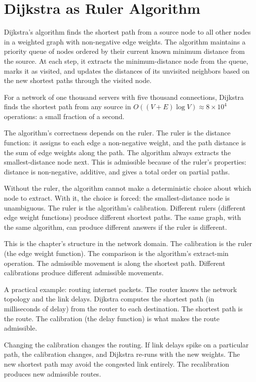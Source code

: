 \section{Dijkstra as Ruler Algorithm}
\label{se:dijkstra-as-ruler-algorithm}

Dijkstra's algorithm finds the shortest path from a source node to all
other nodes in a weighted graph with non-negative edge weights. The
algorithm maintains a priority queue of nodes ordered by their current
known minimum distance from the source. At each step, it extracts the
minimum-distance node from the queue, marks it as visited, and updates
the distances of its unvisited neighbors based on the new
shortest paths through the visited node.

For a network of one thousand servers with five thousand
connections, Dijkstra finds the shortest path from any source in
$O((V + E) \log V) \approx 8 \times 10^4$ operations: a small
fraction of a second.

The algorithm's correctness depends on the ruler. The ruler is the
distance function: it assigns to each edge a non-negative weight,
and the path distance is the sum of edge weights along the path.
The algorithm always extracts the smallest-distance node next.
This is admissible because of the ruler's properties: distance is
non-negative, additive, and gives a total order on partial paths.

Without the ruler, the algorithm cannot make a deterministic
choice about which node to extract. With it, the choice is
forced: the smallest-distance node is unambiguous. The ruler is
the algorithm's calibration. Different rulers (different edge
weight functions) produce different shortest paths. The same
graph, with the same algorithm, can produce different answers if
the ruler is different.

This is the chapter's structure in the network domain. The
calibration is the ruler (the edge weight function). The
comparison is the algorithm's extract-min operation. The
admissible movement is along the shortest path. Different
calibrations produce different admissible movements.

A practical example: routing internet packets. The router knows
the network topology and the link delays. Dijkstra computes the
shortest path (in milliseconds of delay) from the router to each
destination. The shortest path is the route. The calibration
(the delay function) is what makes the route admissible.

Changing the calibration changes the routing. If link delays
spike on a particular path, the calibration changes, and Dijkstra
re-runs with the new weights. The new shortest path may avoid the
congested link entirely. The recalibration produces new admissible
routes.

